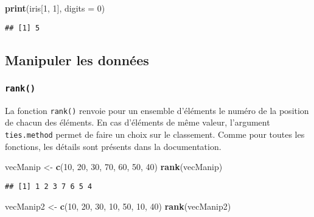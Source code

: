 \documentclass[]{book}
\newenvironment{Shaded}{\begin{snugshade}}{\end{snugshade}}
\newcommand{\KeywordTok}[1]{\textcolor[rgb]{0.13,0.29,0.53}{\textbf{#1}}}
\newcommand{\DataTypeTok}[1]{\textcolor[rgb]{0.13,0.29,0.53}{#1}}
\newcommand{\DecValTok}[1]{\textcolor[rgb]{0.00,0.00,0.81}{#1}}
\newcommand{\StringTok}[1]{\textcolor[rgb]{0.31,0.60,0.02}{#1}}
\newcommand{\NormalTok}[1]{#1}
\theoremstyle{definition}
\theoremstyle{definition}
\theoremstyle{definition}
\theoremstyle{remark}
\begin{document}
\begin{Shaded}
\begin{Highlighting}[]
\KeywordTok{print}\NormalTok{(iris[}\DecValTok{1}\NormalTok{, }\DecValTok{1}\NormalTok{], }\DataTypeTok{digits =} \DecValTok{0}\NormalTok{)}
\end{Highlighting}
\end{Shaded}

\begin{verbatim}
## [1] 5
\end{verbatim}

\subsection{Manipuler les données}\label{manipuler-les-donnees}

\subsubsection{\texorpdfstring{\texttt{rank()}}{rank()}}\label{l015rank}

La fonction \texttt{rank()} renvoie pour un ensemble d'éléments le
numéro de la position de chacun des éléments. En cas d'éléments de même
valeur, l'argument \texttt{ties.method} permet de faire un choix sur le
classement. Comme pour toutes les fonctions, les détails sont présents
dans la documentation.

\begin{Shaded}
\begin{Highlighting}[]
\NormalTok{vecManip <-}\StringTok{ }\KeywordTok{c}\NormalTok{(}\DecValTok{10}\NormalTok{, }\DecValTok{20}\NormalTok{, }\DecValTok{30}\NormalTok{, }\DecValTok{70}\NormalTok{, }\DecValTok{60}\NormalTok{, }\DecValTok{50}\NormalTok{, }\DecValTok{40}\NormalTok{)}
\KeywordTok{rank}\NormalTok{(vecManip)}
\end{Highlighting}
\end{Shaded}

\begin{verbatim}
## [1] 1 2 3 7 6 5 4
\end{verbatim}

\begin{Shaded}
\begin{Highlighting}[]
\NormalTok{vecManip2 <-}\StringTok{ }\KeywordTok{c}\NormalTok{(}\DecValTok{10}\NormalTok{, }\DecValTok{20}\NormalTok{, }\DecValTok{30}\NormalTok{, }\DecValTok{10}\NormalTok{, }\DecValTok{50}\NormalTok{, }\DecValTok{10}\NormalTok{, }\DecValTok{40}\NormalTok{)}
\KeywordTok{rank}\NormalTok{(vecManip2)}
\end{Highlighting}
\end{Shaded}
\end{document}

